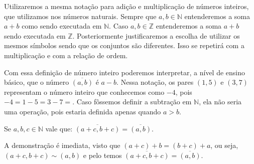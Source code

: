 \documentclass[../main.tex]{subfiles}
\begin{document}
\begin{obs}
    Utilizaremos a mesma notação para adição e multiplicação de números inteiros, que utilizamos nos números naturais. Sempre que $a,b \in \mathbb{N}$ entenderemos a soma $a+b$ como sendo executada em $\mathbb{N}$. Caso $a,b \in \mathbb{Z}$ entenderemos a soma $a+b$ sendo executada em $\mathbb{Z}$. Posteriormente justificaremos a escolha de utilizar os mesmos símbolos sendo que os conjuntos são diferentes. Isso se repetirá com a multiplicação e com a relação de ordem.
\end{obs}

Com essa definição de número inteiro poderemos interpretar, a nível de ensino básico, que o número $\overline{(a,b)}$ é $a - b$. Nessa notação, os pares $(1,5)$ e $(3,7)$ representam o número inteiro que conhecemos como $-4$, pois $-4 = 1-5 =  3-7=$. Caso fôssemos definir a subtração em $\mathbb{N}$, ela não seria uma operação, pois estaria definida apenas quando $a > b$. 

\begin{prop}\label{int-prop-cancelaCoordenadas}
    Se $a,b,c \in \mathbb{N}$ vale que: $\overline{(a+c,b+c)} = \overline{(a,b)}$.
\end{prop}
\begin{dem}
    A demonstração é imediata, visto que $(a+c)+b = (b+c)+a$, ou seja, $(a+c,b+c) \sim (a,b)$ e pelo  temos $\overline{(a+c,b+c)} = \overline{(a,b)}$.
\end{dem}
\end{document}
